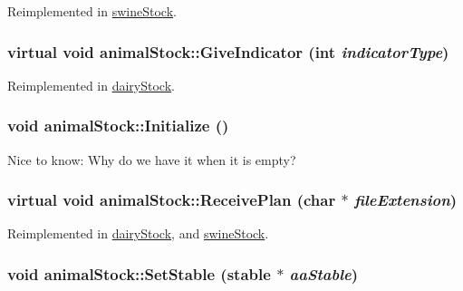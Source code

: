 Reimplemented in \hyperlink{classswine_stock_af63160db1074a36becd0b5dfb0859945}{swineStock}.\hypertarget{classanimal_stock_a7d6f9b68a88f2e5399f8dcdb3965a4f6}{
\subsubsection[{GiveIndicator}]{\setlength{\rightskip}{0pt plus 5cm}virtual void animalStock::GiveIndicator (int {\em indicatorType})}}
\label{classanimal_stock_a7d6f9b68a88f2e5399f8dcdb3965a4f6}


Reimplemented in \hyperlink{classdairy_stock_a3d06c27cd2651c99b1fdf1273d0f6289}{dairyStock}.\hypertarget{classanimal_stock_a6f4c6825f213b660f9c5cca109119a1c}{
\subsubsection[{Initialize}]{\setlength{\rightskip}{0pt plus 5cm}void animalStock::Initialize ()}}
\label{classanimal_stock_a6f4c6825f213b660f9c5cca109119a1c}
Nice to know: Why do we have it when it is empty? \hypertarget{classanimal_stock_a725a20b1ebac99314da9371c17aaad82}{
\subsubsection[{ReceivePlan}]{\setlength{\rightskip}{0pt plus 5cm}virtual void animalStock::ReceivePlan (char $\ast$ {\em fileExtension})}}
\label{classanimal_stock_a725a20b1ebac99314da9371c17aaad82}


Reimplemented in \hyperlink{classdairy_stock_aa06e97a86fe280ee6b23ea2985317b65}{dairyStock}, and \hyperlink{classswine_stock_acf5744db1aac193ee2af257c4554918d}{swineStock}.\hypertarget{classanimal_stock_a290892905be4b6f7e9efd445bdb37edd}{
\subsubsection[{SetStable}]{\setlength{\rightskip}{0pt plus 5cm}void animalStock::SetStable ({\bf stable} $\ast$ {\em aaStable})}}
\label{classanimal_stock_a290892905be4b6f7e9efd445bdb37edd}


